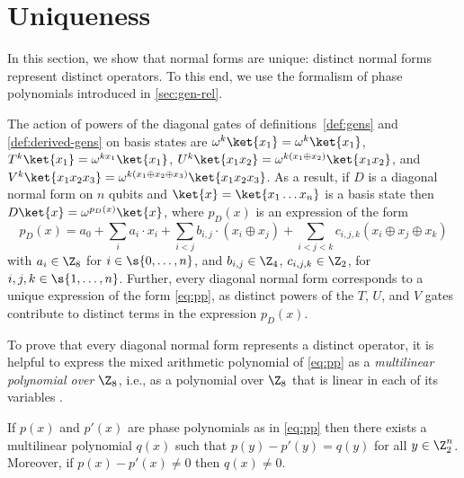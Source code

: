 \documentclass{eptcs}
\begin{document}
\section{Uniqueness}
\label{sec:uniqueness}

In this section, we show that normal forms are unique: distinct normal
forms represent distinct operators. To this end, we use the formalism
of phase polynomials introduced in \cref{sec:gen-rel}.

The action of powers of the diagonal gates of
definitions~\ref{def:gens} and \ref{def:derived-gens} on basis states
are $\omega^k\ket{x_1} = \omega^k\ket{x_1}$,
$T^k\ket{x_1}=\omega^{kx_1}\ket{x_1}$,
$U^k\ket{x_1x_2}=\omega^{k(x_1\oplus x_2)}\ket{x_1x_2}$, and
$V^k\ket{x_1x_2x_3}=\omega^{k(x_1\oplus x_2\oplus
  x_3)}\ket{x_1x_2x_3}$. As a result, if $D$ is a diagonal normal form
on $n$ qubits and $\ket{x}=\ket{x_1\ldots x_n}$ is a basis state then
$D\ket{x} = \omega^{p_D(x)}\ket{x}$, where $p_D(x)$ is an expression
of the form
\begin{equation}
  \label{eq:pp}
  p_D(x)= a_0 + \sum_i a_i\cdot x_i + 
  \sum_{i < j} b_{i,j}\cdot(x_i \oplus x_j) + 
  \sum_{i < j < k} c_{i,j,k}(x_i \oplus x_j \oplus x_k)
\end{equation}
with $a_i\in\Z_8$ for $i\in\s{0,\ldots,n}$, and $b_{i,j}\in\Z_4$,
$c_{i,j,k}\in\Z_2$, for $i,j,k \in \s{1,\ldots,n}$. Further, every
diagonal normal form corresponds to a unique expression of the form
\cref{eq:pp}, as distinct powers of the $T$, $U$, and $V$ gates
contribute to distinct terms in the expression $p_D(x)$.

To prove that every diagonal normal form represents a distinct
operator, it is helpful to express the mixed arithmetic polynomial of
\cref{eq:pp} as a \emph{multilinear polynomial over $\Z_8$}, i.e., as
a polynomial over $\Z_8$ that is linear in each of its variables
\cite{OD14}.

\begin{lemma}
  \label{lem:phase-to-multilinear}
  If $p(x)$ and $p'(x)$ are phase polynomials as in \cref{eq:pp} then
  there exists a multilinear polynomial $q(x)$ such that
  $p(y) - p'(y)= q(y)$ for all $y\in\Z_2^n$. Moreover, if
  $p(x)- p'(x) \neq 0$ then $q(x)\neq 0$.
\end{lemma}
\end{document}
